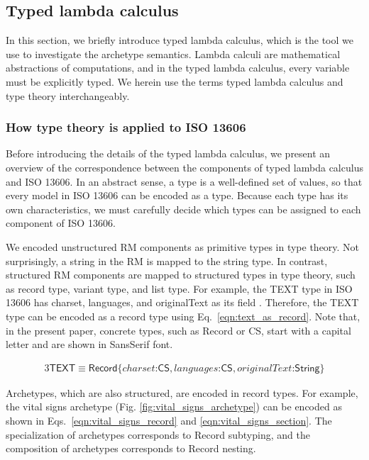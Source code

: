 \documentclass[preprint,3p,onecolumn,times,review]{article}
\begin{document}
{\subsection{Typed lambda calculus}

In this section, we briefly introduce typed lambda calculus, which is the tool we use to investigate the archetype semantics. Lambda calculi are mathematical abstractions of computations, and in the typed lambda calculus, every variable must be explicitly typed. 
We herein use the terms typed lambda calculus and type theory interchangeably.

\subsubsection{How type theory is applied to ISO 13606}

Before introducing the details of the typed lambda calculus, we present an overview of the correspondence between the components of typed lambda calculus and ISO 13606.
In an abstract sense, a type is a well-defined set of values, so that every model in ISO 13606 can be encoded as a type.
Because each type has its own characteristics, we must carefully decide which types can be assigned to each component of ISO 13606.

We encoded unstructured RM components as primitive types in type theory.
Not surprisingly, a string in the RM is mapped to the string type. 
In contrast, structured RM components are mapped to structured types in type theory, such as record type, variant type, and list type.
For example, the TEXT type in ISO 13606 has charset, languages, and originalText as its field \cite[p.36]{iso08:13606_healt_elect_part1}.
Therefore, the TEXT type can be encoded as a record type using Eq.~\ref{eqn:text_as_record}.
Note that, in the present paper, concrete types, such as {\sf Record} or {\sf CS}, start with a capital letter and are shown in {\sf SansSerif} font.


\begin{figure}[!htbp]
\begin{alignat}{3}
  \mathsf{TEXT} \equiv \mathsf{Record}\{charset \text{:} \mathsf{CS}, languages \text{:} \mathsf{CS}, originalText \text{:} \mathsf{String} \}  \label{eqn:text_as_record}
\end{alignat}
\end{figure}

Archetypes, which are also structured, are encoded in record types.
For example, the vital signs archetype (Fig. \ref{fig:vital_signs_archetype}) can be encoded as shown in Eqs.~\ref{eqn:vital_signs_record} and \ref{eqn:vital_signs_section}.
The specialization of archetypes corresponds to Record subtyping, and the composition of archetypes corresponds to Record nesting.

}
\end{document}
